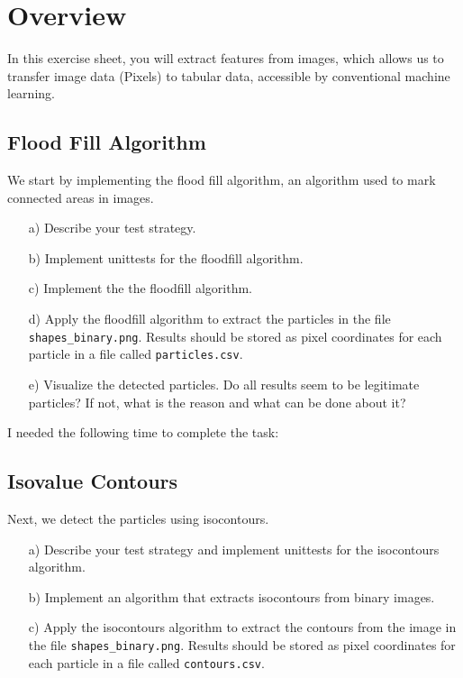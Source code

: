 \documentclass{article}
\begin{document}
\thispagestyle{page1} 

\section{Overview}

In this exercise sheet, you will extract features from images, which allows us to transfer image data (Pixels) to tabular data, accessible by conventional machine learning.

\subsection{Flood Fill Algorithm}

We start by implementing the flood fill algorithm, an algorithm used to mark connected areas in images. 

\begin{enumerate}

\item[a)] Describe your test strategy.

\item[b)] Implement unittests for the floodfill algorithm.

\item[c)] Implement the the floodfill algorithm.

\item[d)] Apply the floodfill algorithm to extract the particles in the file \texttt{shapes\_binary.png}. Results should be stored as pixel coordinates for each particle in a file called \texttt{particles.csv}.

\item[e)] Visualize the detected particles. Do all results seem to be legitimate particles? If not, what is the reason and what can be done about it?

\end{enumerate}

I needed the following time to complete the task:

\subsection{Isovalue Contours}

Next, we detect the particles using isocontours. 

\begin{enumerate}

\item[a)] Describe your test strategy and implement unittests for the isocontours algorithm.

\item[b)] Implement an algorithm that extracts isocontours from binary images. 

\item[c)] Apply the isocontours algorithm to extract the contours from the image in the file \texttt{shapes\_binary.png}. Results should be stored as pixel coordinates for each particle in a file called \texttt{contours.csv}.

\end{enumerate}
\end{document}
